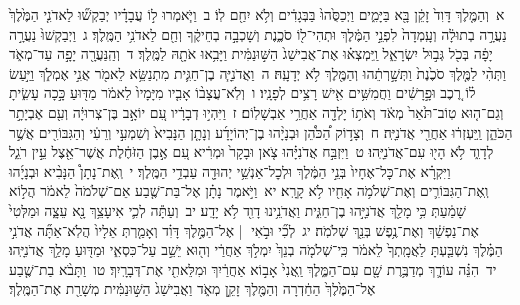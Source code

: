 \documentclass[18pt]{article}
\begin{document}
\startlock
 {\loc א~}וְהַמֶּ֤לֶךְ דָּוִד֙ זָקֵ֔ן בָּ֖א בַּיָּמִ֑ים וַיְכַסֻּ֙הוּ֙ בַּבְּגָדִ֔ים וְלֹ֥א יִחַ֖ם לֽוֹ׃ \startlock
 {\loc ב~}וַיֹּ֧אמְרוּ ל֣וֹ עֲבָדָ֗יו יְבַקְשׁ֞וּ לַאדֹנִ֤י הַמֶּ֙לֶךְ֙ נַעֲרָ֣ה בְתוּלָ֔ה וְעָֽמְדָה֙ לִפְנֵ֣י הַמֶּ֔לֶךְ וּתְהִי־ל֖וֹ סֹכֶ֑נֶת וְשָׁכְבָ֣ה בְחֵיקֶ֔ךָ וְחַ֖ם לַאדֹנִ֥י הַמֶּֽלֶךְ׃ \startlock
 {\loc ג~}וַיְבַקְשׁוּ֙ נַעֲרָ֣ה יָפָ֔ה בְּכֹ֖ל גְּב֣וּל יִשְׂרָאֵ֑ל וַֽיִּמְצְא֗וּ אֶת־אֲבִישַׁג֙ הַשּׁ֣וּנַמִּ֔ית וַיָּבִ֥אוּ אֹתָ֖הּ לַמֶּֽלֶךְ׃ \startlock
 {\loc ד~}וְהַֽנַּעֲרָ֖ה יָפָ֣ה עַד־מְאֹ֑ד וַתְּהִ֨י לַמֶּ֤לֶךְ סֹכֶ֙נֶת֙ וַתְּשָׁ֣רְתֵ֔הוּ וְהַמֶּ֖לֶךְ לֹ֥א יְדָעָֽהּ׃ \startlock
 {\loc ה~}וַאֲדֹנִיָּ֧ה בֶן־חַגִּ֛ית מִתְנַשֵּׂ֥א לֵאמֹ֖ר אֲנִ֣י אֶמְלֹ֑ךְ וַיַּ֣עַשׂ ל֗וֹ רֶ֚כֶב וּפָ֣רָשִׁ֔ים וַחֲמִשִּׁ֥ים אִ֖ישׁ רָצִ֥ים לְפָנָֽיו׃ \startlock
 {\loc ו~}וְלֹֽא־עֲצָב֨וֹ אָבִ֤יו מִיָּמָיו֙ לֵאמֹ֔ר מַדּ֖וּעַ כָּ֣כָה עָשִׂ֑יתָ וְגַם־ה֤וּא טֽוֹב־תֹּ֙אַר֙ מְאֹ֔ד וְאֹת֥וֹ יָלְדָ֖ה אַחֲרֵ֥י אַבְשָׁלֽוֹם׃ \startlock
 {\loc ז~}וַיִּהְי֣וּ דְבָרָ֔יו עִ֚ם יוֹאָ֣ב בֶּן־צְרוּיָ֔ה וְעִ֖ם אֶבְיָתָ֣ר הַכֹּהֵ֑ן וַֽיַּעְזְר֔וּ אַחֲרֵ֖י אֲדֹנִיָּֽה׃ \startlock
 {\loc ח~}וְצָד֣וֹק הַ֠כֹּהֵ֠ן וּבְנָיָ֨הוּ בֶן־יְהוֹיָדָ֜ע וְנָתָ֤ן הַנָּבִיא֙ וְשִׁמְעִ֣י וְרֵעִ֔י וְהַגִּבּוֹרִ֖ים אֲשֶׁ֣ר לְדָוִ֑ד לֹ֥א הָי֖וּ עִם־אֲדֹנִיָּֽהוּ׃ \startlock
 {\loc ט~}וַיִּזְבַּ֣ח אֲדֹנִיָּ֗הוּ צֹ֤אן וּבָקָר֙ וּמְרִ֔יא עִ֚ם אֶ֣בֶן הַזֹּחֶ֔לֶת אֲשֶׁר־אֵ֖צֶל עֵ֣ין רֹגֵ֑ל וַיִּקְרָ֗א אֶת־כׇּל־אֶחָיו֙ בְּנֵ֣י הַמֶּ֔לֶךְ וּלְכׇל־אַנְשֵׁ֥י יְהוּדָ֖ה עַבְדֵ֥י הַמֶּֽלֶךְ׃ \startlock
 {\loc י~}וְֽאֶת־נָתָן֩ הַנָּבִ֨יא וּבְנָיָ֜הוּ וְֽאֶת־הַגִּבּוֹרִ֛ים וְאֶת־שְׁלֹמֹ֥ה אָחִ֖יו לֹ֥א קָרָֽא׃ \startlock
 {\loc יא~}וַיֹּ֣אמֶר נָתָ֗ן אֶל־בַּת־שֶׁ֤בַע אֵם־שְׁלֹמֹה֙ לֵאמֹ֔ר הֲל֣וֹא שָׁמַ֔עַתְּ כִּ֥י מָלַ֖ךְ אֲדֹנִיָּ֣הוּ בֶן־חַגִּ֑ית וַאֲדֹנֵ֥ינוּ דָוִ֖ד לֹ֥א יָדָֽע׃ \startlock
 {\loc יב~}וְעַתָּ֕ה לְכִ֛י אִיעָצֵ֥ךְ נָ֖א עֵצָ֑ה וּמַלְּטִי֙ אֶת־נַפְשֵׁ֔ךְ וְאֶת־נֶ֥פֶשׁ בְּנֵ֖ךְ שְׁלֹמֹֽה׃ \startlock
 {\loc יג~}לְכִ֞י וּבֹ֣אִי  |  אֶל־הַמֶּ֣לֶךְ דָּוִ֗ד וְאָמַ֤רְתְּ אֵלָיו֙ הֲלֹֽא־אַתָּ֞ה אֲדֹנִ֣י הַמֶּ֗לֶךְ נִשְׁבַּ֤עְתָּ לַאֲמָֽתְךָ֙ לֵאמֹ֔ר כִּֽי־שְׁלֹמֹ֤ה בְנֵךְ֙ יִמְלֹ֣ךְ אַחֲרַ֔י וְה֖וּא יֵשֵׁ֣ב עַל־כִּסְאִ֑י וּמַדּ֖וּעַ מָלַ֥ךְ אֲדֹנִיָּֽהוּ׃ \startlock
 {\loc יד~}הִנֵּ֗ה עוֹדָ֛ךְ מְדַבֶּ֥רֶת שָׁ֖ם עִם־הַמֶּ֑לֶךְ וַֽאֲנִי֙ אָב֣וֹא אַחֲרַ֔יִךְ וּמִלֵּאתִ֖י אֶת־דְּבָרָֽיִךְ׃ \startlock
 {\loc טו~}וַתָּבֹ֨א בַת־שֶׁ֤בַע אֶל־הַמֶּ֙לֶךְ֙ הַחַ֔דְרָה וְהַמֶּ֖לֶךְ זָקֵ֣ן מְאֹ֑ד וַאֲבִישַׁג֙ הַשּׁ֣וּנַמִּ֔ית מְשָׁרַ֖ת אֶת־הַמֶּֽלֶךְ׃ \startlock
\end{document}
